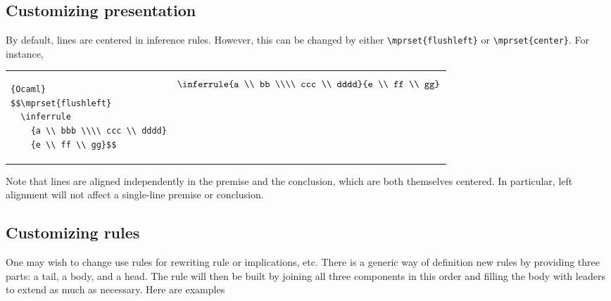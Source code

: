 \documentclass {article}
\let \lst \verb
\begin{document}
\subsection {Customizing presentation}

By default, lines are centered in inference rules.
However, this can be changed by either \lst"\mprset{flushleft}"
or \lst"\mprset{center}". For instance,

\begin{tabular}{m{0.44\hsize}m{0.44\hsize}}
\begin{lstlisting}{Ocaml}
$$\mprset{flushleft}
  \inferrule
    {a \\ bbb \\\\ ccc \\ dddd}
    {e \\ ff \\ gg}$$
\end{lstlisting}
&
$$%
\hsize 0.45\hsize
\inferrule {a \\ bb  \\\\
         ccc \\ dddd}{e \\ ff \\ gg}$$
\\
\end{tabular}

\noindent
Note that lines are aligned independently in the premise and the
conclusion, which are both themselves centered. In particular,
left alignment will not affect a single-line premise or conclusion.

\subsection {Customizing rules}

One may wish to change use rules for rewriting rule or implications, etc.
There is a generic way of definition new rules by providing three parts:
a tail, a body, and a head. The rule will then be built by joining
all three components in this order and filling the body with leaders to
extend as much as necessary. Here are examples
\end{document}
